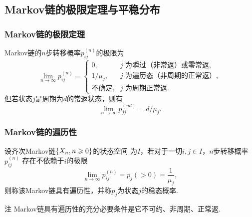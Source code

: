 \subsection{Markov链的极限定理与平稳分布}

\begin{frame}
    \frametitle{Markov链的极限定理}
    \begin{mytheorem}[Markov链的极限定理]
        Markov链的$n$步转移概率$p_{ij}^{(n)}$的极限为
        \begin{equation}
            \lim_{n\to\infty}p_{ij}^{(n)}=
            \begin{cases}
                0,&j\text{ 为瞬过（非常返）或零常返},\\
                1/\mu_j,&j\text{ 为遍历态（非周期的正常返）},\\
                \text{不确定},&j\text{ 为周期正常返}.
            \end{cases}
        \end{equation}
        但若状态$j$是周期为$d$的常返状态，则有
        \begin{equation}
            \lim_{n\to\infty}p_{jj}^{(nd)}=d/\mu_j.
        \end{equation}
    \end{mytheorem}
\end{frame}

\begin{frame}
    \frametitle{Markov链的遍历性}
    \begin{mydefinition}[Markov链的遍历性]
        设齐次Markov链$\left\{X_n,n\geqslant 0\right\}$的状态空间
        为$I$，若对于一切$i,j\in I$，$n$步转移概率$p_{ij}^{(n)}$
        存在不依赖于$i$的极限
        \begin{equation}
            \lim_{n\to\infty}p_{ij}^{(n)}=p_j(>0)=\frac1{\mu_j},
        \end{equation}
        则称该Markov链具有遍历性，并称$p_j$为状态$j$的稳态概率. 
    \end{mydefinition}
    \begin{block}{注}
        Markov链具有遍历性的充分必要条件是它不可约、非周期、正常返. 
    \end{block}
\end{frame}

